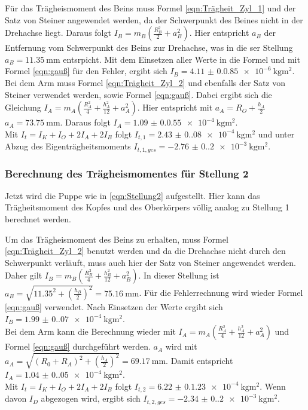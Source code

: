     Für das Trägheismoment des Beins muss Formel \ref{eqn:Trägheit_Zyl_1} und der Satz von Steiner angewendet werden, da der  Schwerpunkt des Beines nicht in der Drehachse liegt.
    Daraus folgt $I_B=m_B(\frac{R_B^2}{2}+a_B^2)$.
    Hier entspricht $a_B$ der Entfernung vom Schwerpunkt des Beins zur Drehachse, was in die
    ser Stellung $a_B=\qty{11.35}{\milli\meter}$ entsrpicht.
    Mit dem Einsetzen aller Werte in die Formel und mit Formel \ref{eqn:gauß} für den Fehler, ergibt sich $I_B=\qty{4.11(0.085)e-6}{\kilo\gram\meter\squared}$.\\

    Bei dem Arm muss Formel \ref{eqn:Trägheit_Zyl_2} und ebenfalls der Satz von Steiner verwendet werden, sowie Formel \ref{eqn:gauß}.
    Dabei ergibt sich die Gleichung $I_A=m_A(\frac{R_A^2}{4}+\frac{h_A^2}{12}+a_A^2)$.
    Hier entspricht mit $a_A=R_O+\frac{h_A}{2}$ \; $a_A=\qty{73.75}{\milli\meter}$.
    Daraus folgt $I_A=\qty{1.09(0.055)e-4}{\kilo\gram\meter\squared}$.\\
    
    Mit $I_{t}=I_K+I_O+2I_A+2I_B$ folgt $I_{t,1}=\qty{2.43(0.08)e-4}{\kilo\gram\meter\squared}$ und unter Abzug des Eigenträgheitsmoments
     $I_{t,1,ges}=\qty{-2.76(0.2)e-3}{\kilo\gram\meter\squared}$.

    \subsubsection{Berechnung des Trägheismomentes für Stellung 2}
    Jetzt wird die Puppe wie in \ref{eqn:Stellung2} aufgestellt.%
    Hier kann das Trägheitsmoment des Kopfes und des Oberkörpers völlig analog zu Stellung 1 berechnet werden.
    
    Um das Trägheismoment des Beins zu erhalten, muss Formel \ref{eqn:Trägheit_Zyl_2} benutzt werden und da die Drehachse nicht durch den Schwerpunkt verläuft, muss auch hier der Satz von Steiner angewendet werden.
    Daher gilt $I_B=m_B(\frac{R_B^2}{4}+\frac{h_B^2}{12}+a_B^2)$.
    In dieser Stellung ist $a_B=\sqrt{11.35^2+(\frac{h_B}{2})^2}=\qty{75.16}{\milli\meter}$.
    Für die Fehlerrechnung wird wieder Formel \ref{eqn:gauß} verwendet.
    Nach Einsetzen der Werte ergibt sich $I_B=\qty{1.99(0.07)e-4}{\kilo\gram\meter\squared}$.\\

    Bei dem Arm kann die Berechnung wieder mit $I_A=m_A(\frac{R_A^2}{4}+\frac{h_A^2}{12}+a_A^2)$ und Formel \ref{eqn:gauß} durchgeführt werden.
    $a_A$ wird mit $a_A=\sqrt{(R_0+R_A)^2+(\frac{h_A}{2})^2}=\qty{69.17}{\milli\meter}$.
    Damit entspricht $I_A=\qty{1.04(0.05)e-4}{\kilo\gram\meter\squared}$.\\
    
    Mit $I_{t}=I_K+I_O+2I_A+2I_B$ folgt $I_{t,2}=\qty{6.22(0.123)e-4}{\kilo\gram\meter\squared}$.
    Wenn davon $I_D$ abgezogen wird, ergibt sich $I_{t,2,ges}=\qty{-2.34(0.2)e-3}{\kilo\gram\meter\squared}$.





    
    

    

    
